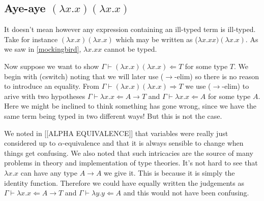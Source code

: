 \begin{example}
\subsection{Aye-aye $(\lambda x . x)(\lambda x . x)$} %

It doesn't mean however any expression containing an ill-typed term is ill-typed. Take for instance $(\lambda x . x)( \lambda x . x)$ which may be written as ($\lambda x . x x) (\lambda x . x)$. As we saw in \ref{mockingbird}, $\lambda x . x x$ cannot be typed.

\begin{example}\label{ayeaye}
    Now suppose we want to show $\Gamma \vdash (\lambda x . x)(\lambda x . x) \Leftarrow T$ for some type $T$. We begin with (cswitch) noting that we will later use ($\to$-elim) so there is no reason to introduce an equality. From $\Gamma \vdash (\lambda x . x)(\lambda x . x) \Rightarrow T$ we use ($\to$-elim) to arive with two hypotheses $\Gamma \vdash \lambda x . x \Leftarrow A \to T$ and $\Gamma \vdash \lambda x. x \Leftarrow A$ for some type $A$. Here we might be inclined to think something has gone wrong, since we have the same term being typed in two different ways! But this is not the case.
    
    We noted in [[ALPHA EQUIVALENCE]] that variables were really just considered up to $\alpha$-equivalence and that it is always sensible to change when things get confusing. We also noted that such intricacies are the source of many problems in theory and implementation of type theories.
    It's not hard to see that $\lambda x . x$ can have any type $A \to A$ we give it. This is because it is simply the identity function. Therefore we could have equally written the judgements as $\Gamma \vdash \lambda x . x \Leftarrow A \to T$ and $\Gamma \vdash \lambda y . y \Leftarrow A$ and this would not have been confusing.
    

\end{example}
\end{example}
